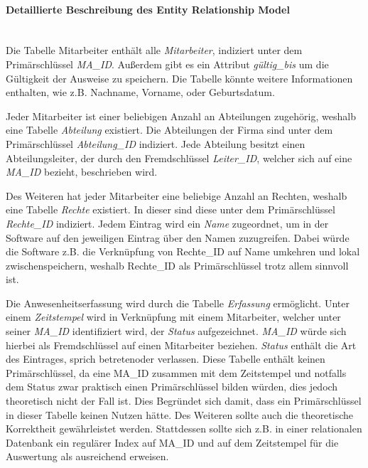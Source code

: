 \newpage
\paragraph*{Detaillierte Beschreibung des Entity Relationship Model}\mbox{} \\

Die Tabelle Mitarbeiter enthält alle \textit{Mitarbeiter}, indiziert unter dem Primär\-schlüssel \textit{MA\_ID}.
Außerdem gibt es ein Attribut \textit{gültig\_bis} um die Gültigkeit der Ausweise zu speichern.
Die Tabelle könnte weitere Informationen enthalten, wie z.B. \glqq Nachname\grqq, \glqq Vorname\grqq, oder \glqq Geburtsdatum\grqq. \newline

Jeder Mitarbeiter ist einer beliebigen Anzahl an Abteilungen zugehörig, weshalb eine Tabelle \textit{Abteilung} existiert.
Die Abteilungen der Firma sind unter dem Primärschlüssel \textit{Abteilung\_ID} indiziert.
Jede Abteilung besitzt einen Abteilungsleiter, der durch den Fremdschlüssel \textit{Leiter\_ID}, welcher sich auf eine \textit{MA\_ID} bezieht, beschrieben wird. \newline

Des Weiteren hat jeder Mitarbeiter eine beliebige Anzahl an Rechten, weshalb eine Tabelle \textit{Rechte} existiert.
In dieser sind diese unter dem Primärschlüssel \textit{Rechte\_ID} indiziert.
Jedem Eintrag wird ein \textit{Name} zugeordnet, um in der Software auf den jeweiligen Eintrag über den Namen zuzugreifen.
Dabei würde die Software z.B. die Verknüpfung von Rechte\_ID auf Name umkehren und lokal zwischenspeichern, weshalb Rechte\_ID als Primärschlüssel trotz allem sinnvoll ist. \newline

Die Anwesenheitserfassung wird durch die Tabelle \textit{Erfassung} ermöglicht.
Unter einem \textit{Zeitstempel} wird in Verknüpfung mit einem Mitarbeiter, welcher unter seiner \textit{MA\_ID} identifiziert wird, der \textit{Status} aufgezeichnet.
\textit{MA\_ID} würde sich hierbei als Fremdschlüssel auf einen Mitarbeiter beziehen.
\textit{Status} enthält die Art des Eintrages, sprich \glqq betreten\grqq oder \glqq verlassen\grqq.
Diese Tabelle enthält keinen Primärschlüssel, da eine MA\_ID zusammen mit dem Zeitstempel und notfalls dem Status zwar praktisch einen Primärschlüssel bilden würden, dies jedoch theoretisch nicht der Fall ist.
Dies Begründet sich damit, dass ein Primärschlüssel in dieser Tabelle keinen Nutzen hätte.
Des Weiteren sollte auch die theoretische Korrektheit gewährleistet werden.
Stattdessen sollte sich z.B. in einer relationalen Datenbank ein regulärer Index auf MA\_ID und auf dem Zeitstempel für die Auswertung als ausreichend erweisen. \newline

